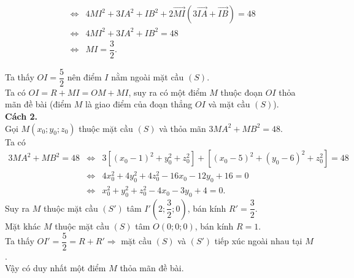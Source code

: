 \begin{ex}
{\begin{itemize}
\begin{eqnarray*}
			&\Leftrightarrow& 4MI^2+3IA^2+IB^2+2\overrightarrow{MI}\left( 3\overrightarrow{IA}+\overrightarrow{IB} \right)=48\\
			&\Leftrightarrow& 4MI^2+3IA^2+IB^2=48\\
			&\Leftrightarrow& MI=\dfrac{3}{2}.
		\end{eqnarray*}
	\end{itemize}
	Ta thấy $OI=\dfrac{5}{2}$ nên điểm $I$ nằm ngoài mặt cầu $(S)$.\\
	Ta có $OI=R+MI=OM+MI$, suy ra có một điểm $M$ thuộc đoạn $OI$ thỏa mãn đề bài (điểm $M$ là giao điểm của đoạn thẳng $OI$ và mặt cầu $(S)$).\\
	\textbf{Cách 2.}\\
	Gọi $M(x_0;y_0;z_0)$ thuộc mặt cầu $(S)$ và thỏa mãn $3MA^2+MB^2=48$.\\
	Ta có
	\allowdisplaybreaks
	\begin{eqnarray*}
		3MA^2+MB^2=48&\Leftrightarrow& 3\left[ (x_0-1)^2+y_0^2+z_0^2 \right]+\left[ (x_0-5)^2+(y_0-6)^2+z_0^2 \right]=48\\
		&\Leftrightarrow& 4x_0^2+4y_0^2+4z_0^2-16x_0-12y_0+16=0\\
		&\Leftrightarrow& x_0^2+y_0^2+z_0^2-4x_0-3y_0+4=0.
	\end{eqnarray*}
	Suy ra $M$ thuộc mặt cầu $(S')$ tâm $I'\left( 2;\dfrac{3}{2};0 \right)$, bán kính $R'=\dfrac{3}{2}$.\\
	Mặt khác $M$ thuộc mặt cầu $(S)$ tâm $O\left( 0;0;0 \right)$, bán kính $R=1$.\\
	Ta thấy $OI'=\dfrac{5}{2}=R+R'\Rightarrow $ mặt cầu $(S)$ và $(S')$ tiếp xúc ngoài nhau tại $M$.\\
	Vậy có duy nhất một điểm $M$ thỏa mãn đề bài.
}
\end{ex}

